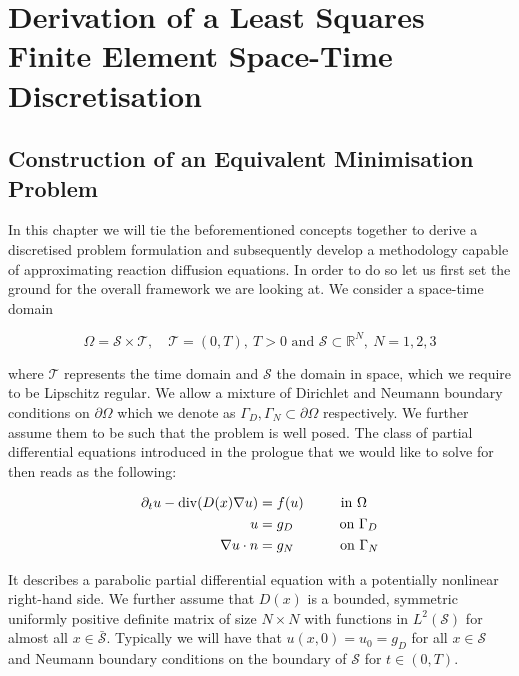 \documentclass[../draft_1.tex]{subfiles}
\begin{document}
\chapter{Derivation of a  Least Squares Finite Element Space-Time Discretisation}
\section{Construction of an Equivalent Minimisation Problem}

In this chapter we will tie the beforementioned concepts together to derive a discretised problem formulation and subsequently develop a methodology capable of approximating reaction diffusion equations. In order to do so let us first set the ground for the overall framework we are looking at. We consider a space-time domain 
\begin{ceqn}
\begin{equation}
\Omega = \mathcal{S} \times \mathcal{T}, \quad \mathcal{T} = (0,T), \ T>0 \text{ and }  \mathcal{S} \subset \mathbb{R}^N, \ N = 1,2,3
\end{equation} 
\end{ceqn}
where $\mathcal{T} $ represents the time domain and $ \mathcal{S}$ the domain in space, which we require to be Lipschitz regular. We allow a mixture of Dirichlet and Neumann boundary conditions on $\partial \Omega$ which we denote as $\Gamma_D, \Gamma_N \subset \partial \Omega$ respectively. We further assume them to be such that the problem is well posed. The class of partial differential equations introduced in the prologue that we would like to solve for then reads as the following:
\begin{ceqn}
\begin{align}
\begin{aligned}
\label{strong_form}
\partial_t u - \mathop{}\!\mathrm{div} (D(x) \nabla u) &= f(u) \qquad \  \text{ in } \Omega \\
u &= g_D \quad \qquad \text{ on } \Gamma_D \\
\nabla u \cdot n &= g_N \quad \qquad \text{ on } \Gamma_N
\end{aligned}
\end{align}
\end{ceqn}
It describes a parabolic partial differential equation with a potentially nonlinear right-hand side. We further assume that $D(x)$ is a bounded, symmetric uniformly positive definite matrix of size $N \times N$ with functions in $L^2(\mathcal{S})$ for almost all $ x \in \bar{\mathcal{S}}$. Typically we will have that $u(x,0) = u_0 = g_D$ for all $ x \in \mathcal{S}$ and Neumann boundary conditions on the boundary of $\mathcal{S}$ for $t \in (0,T)$. 
\end{document}
